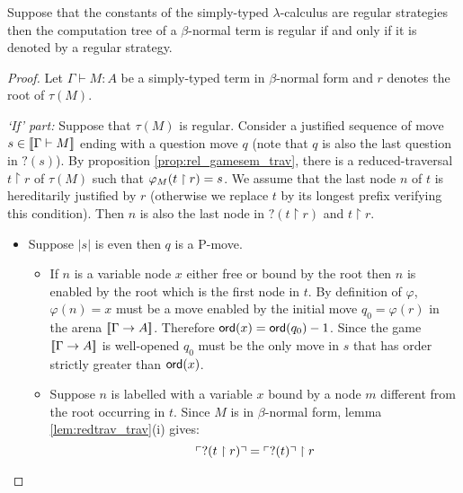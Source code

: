 
\begin{prop}
\label{prop:regular_comp_imp_regular_strat}
Suppose that the constants of the simply-typed $\lambda$-calculus are regular strategies then
the computation tree of a $\beta$-normal term is regular if and only if it is denoted by a regular strategy.
\end{prop}

\begin{proof}
Let $\Gamma \vdash M : A$ be a simply-typed term in $\beta$-normal form
and $r$ denotes the root of $\tau(M)$.

\noindent \emph{`If' part:} Suppose that $\tau(M)$ is regular.
Consider a justified sequence of move $s \in {[\![\Gamma \vdash M ]\!]}$
ending with a question move $q$ (note that $q$ is also the last question in $?(s)$).
By proposition \ref{prop:rel_gamesem_trav}, there
is a reduced-traversal $t \upharpoonright r$ of $\tau(M)$ such that $\varphi_{M}(t \upharpoonright r) = s$.
We assume that the last node $n$ of $t$ is hereditarily justified by $r$ (otherwise we replace $t$ by its longest prefix verifying this condition).
Then $n$ is also the last node in $?(t \upharpoonright r)$ and $t \upharpoonright r$.

\begin{itemize}
\item Suppose $|s|$ is even then $q$ is a P-move.
\begin{itemize}
\item
If $n$ is a variable node $x$ either free or bound by the root then $n$ is enabled by the root which is the first node in $t$.
By definition of $\varphi$, $\varphi(n) = x$ must be a move enabled by the initial move $q_0 = \varphi(r)$ in the arena ${[\![ \Gamma \rightarrow A ]\!]}$.
Therefore ${\sf ord}(x) = {\sf ord}(q_0) - 1$. Since the game ${[\![ \Gamma \rightarrow A ]\!]}$ is well-opened $q_0$ must be the only move in $s$ that
has order strictly greater than ${\sf ord}(x)$.


\item Suppose $n$ is labelled with a variable $x$ bound by a node $m$ different from the root occurring in $t$.
Since $M$ is in $\beta$-normal form, lemma \ref{lem:redtrav_trav}(i) gives:
\begin{equation*}
 \ulcorner ?(t \upharpoonright r) \urcorner = \ulcorner ?(t) \urcorner \upharpoonright  r
\end{equation*}


\end{itemize}
\end{itemize}
\end{proof}
